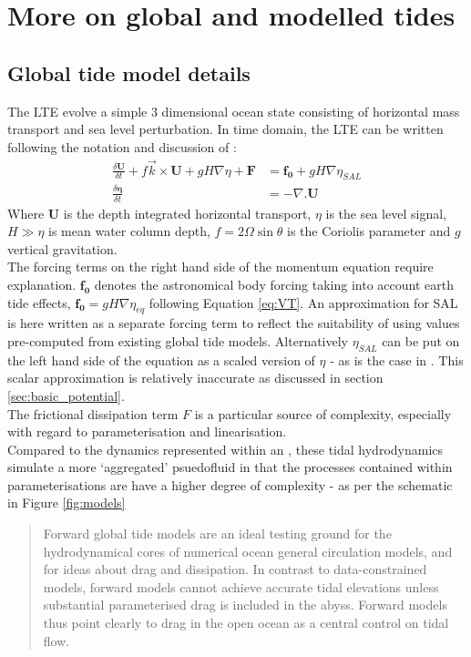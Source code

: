 \chapter{More on global and modelled tides}
\label{appendix:globalTides}
\section{Global tide model details}
The LTE evolve a simple 3 dimensional ocean state consisting of horizontal mass transport and sea level perturbation. In time domain, the LTE can be written following the notation and discussion of \cite[pp185]{Egbert:2002ug}:
\begin{align}
    \label{E:LTE_momtm}
    \frac{\delta \mathbf{U} }{ \delta t} + f\vec{k} \times \mathbf{U} + gH\nabla \eta  + \mathbf{F} &= \mathbf{f_0} + gH \nabla \eta_{SAL} \\
    \label{E:LTE_cont}
    \frac{\delta \mathbf{\eta} }{\delta t} &= -\nabla.\mathbf{U} 
\end{align}
Where $\mathbf{U}$ is the depth integrated horizontal transport, $\eta$ is the sea level signal, $H \gg \eta$ is mean water column depth, $f=2\Omega\sin\theta$ is the Coriolis parameter and $g$ vertical gravitation.\\
The forcing terms on the right hand side of the momentum equation \label{E:LTE_momtm} require explanation.  
$\mathbf{f_0}$ denotes the astronomical body forcing taking into account earth tide effects, $\mathbf{f_0} = gH\nabla\eta_{eq}$ following Equation \ref{eq:VT}.  
An approximation for SAL is here written as a separate forcing term to reflect the suitability of using values pre-computed from existing global tide models.   
Alternatively $\eta_{SAL}$ can be put on the left hand side of the equation as a scaled version of $\eta$ - as is the case in \MOM{}.   
This scalar approximation is relatively inaccurate as discussed in section \ref{sec:basic_potential}.\\
The frictional dissipation term $F$ is a particular source of complexity, especially with regard to parameterisation and linearisation.\\

Compared to the dynamics represented within an \OGCM{}, these tidal hydrodynamics simulate a more `aggregated' psuedofluid in that the processes contained within parameterisations are have a higher degree of complexity - as per the schematic in Figure \ref{fig:models} \\
\begin{quotation}
Forward global tide models are an ideal testing ground for the hydrodynamical cores of numerical ocean general circulation models, and for ideas about drag and dissipation. In contrast to data-constrained models, forward models cannot achieve accurate tidal elevations unless substantial parameterised drag is included in the abyss. Forward models thus point clearly to drag in the open ocean as a central control on tidal flow.\citep{Arbic:2004wz}
\end{quotation} 


